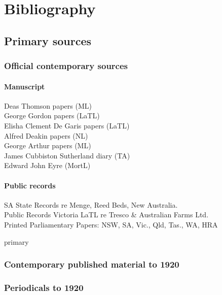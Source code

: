 
\chapter{Bibliography}

\section*{Primary sources}

\subsection*{Official contemporary sources}

\subsubsection*{Manuscript}
Deas Thomson papers (ML)\\
George Gordon papers (LaTL)\\
Elisha Clement De Garis papers (LaTL)\\
Alfred Deakin papers (NL)\\
George Arthur papers (ML)\\
James Cubbiston Sutherland diary (TA)\\
Edward John Eyre (MortL)

\subsubsection*{Public records}
SA State Records re Menge, Reed Beds, New Australia.\\
Public Records Victoria LaTL re Tresco \& Australian Farms Ltd.\\
Printed Parliamentary Papers: NSW, SA, Vic., Qld, Tas., WA, HRA\\


\begin{btSect}{primary}
\subsection*{Contemporary published material to 1920}
\btPrintAll
\end{btSect}

\subsection*{Periodicals to 1920}

